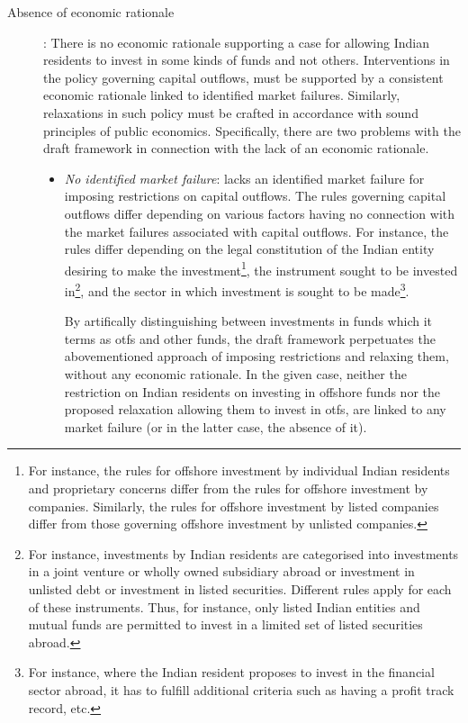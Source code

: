 \documentclass[11pt,a4paper]{article} \usepackage[parfill]{parskip}
\begin{document}
\begin{description}
\item[Absence of economic rationale]: There is no economic rationale
  supporting a case for allowing Indian residents to invest in some
  kinds of funds and not others. Interventions in the policy governing
  capital outflows, must be supported by a consistent economic
  rationale linked to identified market failures. Similarly,
  relaxations in such policy must be crafted in accordance with sound
  principles of public economics. Specifically, there are two problems
  with the draft framework in connection with the lack of an economic
  rationale.

  \begin{itemize}
  \item \textsl{No identified market failure}: 
    lacks an identified market failure for imposing restrictions on
    capital outflows. The rules governing capital outflows differ
    depending on various factors having no connection with the market
    failures associated with capital outflows. For instance, the rules
    differ depending on the legal constitution of the Indian entity
    desiring to make the investment\footnote{For instance, the rules
      for offshore investment by individual Indian residents and
      proprietary concerns differ from the rules for offshore
      investment by companies. Similarly, the rules for offshore
      investment by listed companies differ from those governing
      offshore investment by unlisted companies.}, the instrument
    sought to be invested in\footnote{For instance, investments by
      Indian residents are categorised into investments in a joint
      venture or wholly owned subsidiary abroad or investment in
      unlisted debt or investment in listed securities. Different
      rules apply for each of these instruments. Thus, for instance,
      only listed Indian entities and mutual funds are permitted to
      invest in a limited set of listed securities abroad.}, and the
    sector in which investment is sought to be made\footnote{For
      instance, where the Indian resident proposes to invest in the
      financial sector abroad, it has to fulfill additional criteria
      such as having a profit track record, etc.}.
  
    By artifically distinguishing between investments in funds which
    it terms as \glspl{otf} and other funds, the draft framework
    perpetuates the abovementioned approach of imposing restrictions
    and relaxing them, without any economic rationale. In the given
    case, neither the restriction on Indian residents on investing in
    offshore funds nor the proposed relaxation allowing them to invest
    in \glspl{otf}, are linked to any market failure (or in the latter
    case, the absence of it).


\end{itemize}
\end{description}
\end{document}
